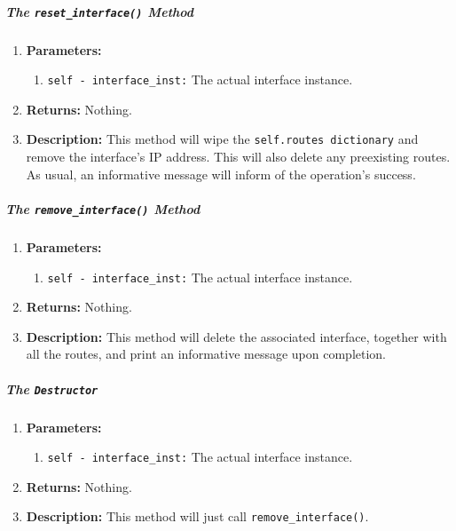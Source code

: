                     \subparagraph{The \texttt{reset\_interface()} Method}
                        \begin{enumerate}
                            \item \textbf{Parameters:}
                            \begin{enumerate}
                                \item \texttt{self - interface\_inst:} The actual interface instance.
                            \end{enumerate}
                            \item \textbf{Returns:} Nothing.
                            \item \textbf{Description:} This method will wipe the \texttt{self.routes dictionary} and remove the interface's IP address. This will also delete any preexisting routes. As usual, an informative message will inform of the operation's success.
                        \end{enumerate}

                    \subparagraph{The \texttt{remove\_interface()} Method}
                        \begin{enumerate}
                            \item \textbf{Parameters:}
                            \begin{enumerate}
                                \item \texttt{self - interface\_inst:} The actual interface instance.
                            \end{enumerate}
                            \item \textbf{Returns:} Nothing.
                            \item \textbf{Description:} This method will delete the associated interface, together with all the routes, and print an informative message upon completion.
                        \end{enumerate}

                    \subparagraph{The \texttt{Destructor}}
                        \begin{enumerate}
                            \item \textbf{Parameters:}
                            \begin{enumerate}
                                \item \texttt{self - interface\_inst:} The actual interface instance.
                            \end{enumerate}
                            \item \textbf{Returns:} Nothing.
                            \item \textbf{Description:} This method will just call \texttt{remove\_interface()}.
                        \end{enumerate}

